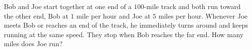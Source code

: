 Bob and Joe start together at one end of a $100$-mile track and both run toward the other end, Bob at $1$ mile per hour and Joe at $5$ miles per hour. Whenever Joe meets Bob or reaches an end of the track, he immediately turns around and keeps running at the same speed. They stop when Bob reaches the far end. How many miles does Joe run?
